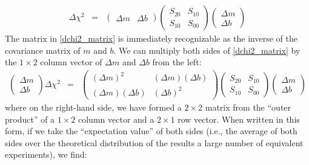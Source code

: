 \documentclass{article}
\begin{document}
\begin{eqnarray}
  \Delta \chi^2 &=& \left(\begin{array}{cc} \Delta m & \Delta b \end{array}\right)\left(\begin{array}{cc} S_{20} & S_{10} \\ S_{10} & S_{00} \end{array}\right)\left(\begin{array}{c} \Delta m \\ \Delta b \end{array}\right) \label{dchi2_matrix}
\end{eqnarray}
The matrix in \eqref{dchi2_matrix} is immediately recognizable as the inverse of the covariance matrix of $m$ and $b$. We can multiply both sides of \eqref{dchi2_matrix} by the $1 \times 2$ column vector of $\Delta m$ and $\Delta b$ from the left:
\begin{eqnarray}
  \left(\begin{array}{c} \Delta m \\ \Delta b \end{array}\right) \Delta \chi^2  &=&  \left(\begin{array}{cc} (\Delta m)^2 & (\Delta m)(\Delta b) \\ (\Delta m)(\Delta b) & (\Delta b)^2  \end{array}\right) \left(\begin{array}{cc} S_{20} & S_{10} \\ S_{10} & S_{00} \end{array}\right) \left(\begin{array}{c} \Delta m \\ \Delta b \end{array}\right) \label{outerprod} 
\end{eqnarray}
where on the right-hand side, we have formed a $2 \times 2$ matrix from the ``outer product'' of a $1 \times 2$ column vector and a $2 \times 1$ row vector. When written in this form, if we take the ``expectation value'' of both sides (i.e., the average of both sides over the theoretical distribution of the results a large number of equivalent experiments), we find:
\end{document}

